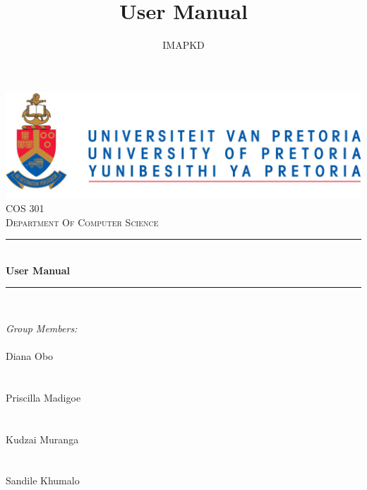 \documentclass[a4paper,12pt]{article}
\author{IMAPKD}
\title{ User Manual}
\newcommand{\HRule}{\rule{\linewidth}{0.5mm}}
\begin{document}
\setlength{\parskip}{6pt}

\begin{titlepage}

\begin{center}
\includegraphics[width=1\textwidth]{./University_of_Pretoria_Logo.PNG}\\[0.4cm]  
\textsc{\LARGE COS 301}\\[0.9cm]
\textsc{\LARGE Department Of Computer Science}\\[0.3cm]


\HRule \\[0.4cm]
{ \huge \bfseries User Manual}\\[0.1cm]
\HRule \\[0.4cm]  


\begin{minipage}{0.4\textwidth}
\begin{flushleft} \large

\emph{\Large Group Members:}\\[0.4cm]    
\emph{}\\
{\Large Diana {Obo}} \\
\emph{}\\
\emph{}\\
{\Large Priscilla {Madigoe}}\\
\emph{}\\
\emph{}\\
{\Large Kudzai {Muranga}} \\
\emph{}\\
\emph{}\\
{\Large Sandile {Khumalo}}\\
\emph{}\\
\emph{}\\

\end{flushleft}
\end{minipage}
\begin{minipage}{0.4\textwidth}
\begin{flushright} \large


\end{flushright}
\end{minipage}
\end{center}
\end{titlepage}
\end{document}
